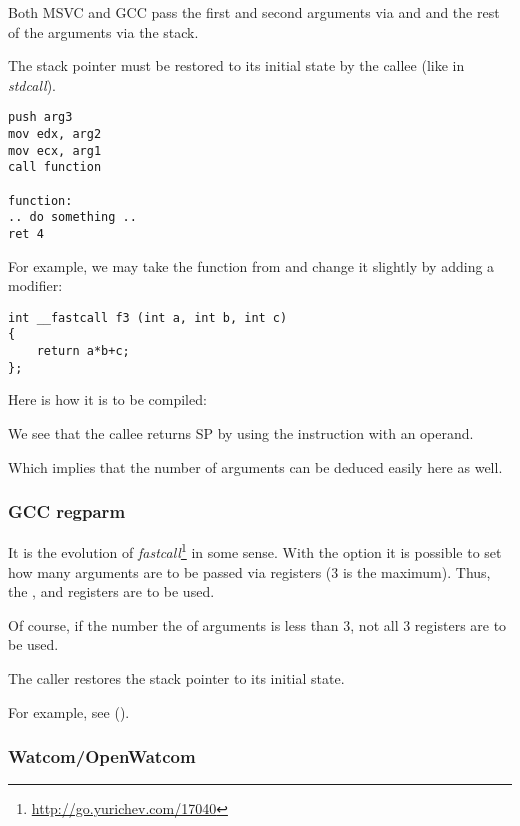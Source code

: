 Both MSVC and GCC pass the first and second arguments via \ECX and \EDX and the rest of the arguments via the stack.

The \gls{stack pointer} must be restored to its initial state by the \gls{callee} (like in \emph{stdcall}).

\begin{lstlisting}[caption=fastcall,style=customasmx86]
push arg3
mov edx, arg2
mov ecx, arg1
call function

function:
.. do something ..
ret 4
\end{lstlisting}

For example, we may take the function from  and change it slightly by adding a  modifier:

\begin{lstlisting}[style=customc]
int __fastcall f3 (int a, int b, int c)
{
	return a*b+c;
};
\end{lstlisting}

Here is how it is to be compiled:



We see that the \gls{callee} returns \ac{SP} by using the  instruction with an operand.

Which implies that the number of arguments can be deduced easily here as well.

\subsubsection{GCC regparm}

\newcommand{\URLREGPARMM}{\url{http://go.yurichev.com/17040}}

It is the evolution of \emph{fastcall}\footnote{\URLREGPARMM} in some sense.
With the  option it is possible to set how many arguments are to be passed via registers (3 is the maximum).
Thus, the \EAX, \EDX and \ECX registers are to be used.

Of course, if the number the of arguments is less than 3, not all 3 registers are to be used.

The \gls{caller} restores the \gls{stack pointer} to its initial state.

For example, see ().

\subsubsection{Watcom/OpenWatcom}

